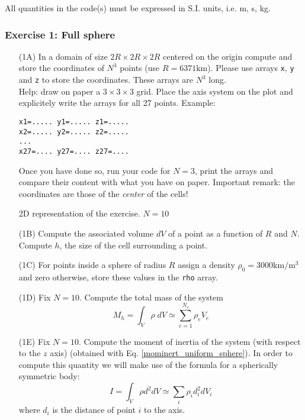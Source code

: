 {\color{red} All quantities in the code(s) must be expressed in S.I. units, i.e. \si{\metre}, \si{\second}, \si{\kilo\gram}. }


\subsubsection*{Exercise 1: Full sphere}

\begin{itemize}
\item[(1A)] In a domain of size $2R\times 2R \times 2R$ centered on the origin compute and store the coordinates 
of $N^3$ points (use $R=6371\si{\kilo\metre}$). Please use arrays {\tt x}, {\tt y} and {\tt z} to store the coordinates.
These arrays are $N^3$ long.\\
Help: draw on paper a $3\times3\times3$ grid. Place the axis system on the plot and explicitely write the arrays 
for all 27 points. Example:
\begin{verbatim}
x1=..... y1=..... z1=.....
x2=..... y2=..... z2=.....
...
x27=.... y27=.... z27=....
\end{verbatim}
Once you have done so, run your code for $N=3$, print the arrays and compare their content with what you 
have on paper.
Important remark: the coordinates are those of the {\it center} of the cells!


\begin{center}

{\captionfont 2D representation of the exercise. $N=10$}
\end{center}



\item[(1B)] Compute the associated volume $dV$ of a point as a function of $R$ and $N$. Compute $h$, the size of the cell surrounding a point.
\item[(1C)] For points inside a sphere of radius $R$ assign a density $\rho_0=3000\si{\kilo\metre\per\cubic\metre}$ 
and zero otherwise, store these values in the {\tt rho} array.

\item[(1D)] Fix $N=10$. Compute the total mass of the system 
\[
M_h = \int_V \rho \; dV \simeq \sum_{e=1}^{N_e} \rho_e V_e
\] 

\item[(1E)] Fix $N=10$. Compute the moment of inertia of the system (with respect to the $z$ axis) 
(obtained with Eq. \ref{mominert_uniform_sphere}). In order to compute this quantity we will make use of
the formula for a spherically symmetric body: 
\[
I = \int_V \rho d^2 dV \simeq \sum_i \rho_i d_i^2 dV_i
\]
where $d_i$ is the distance of point $i$ to the axis.


\end{itemize}

